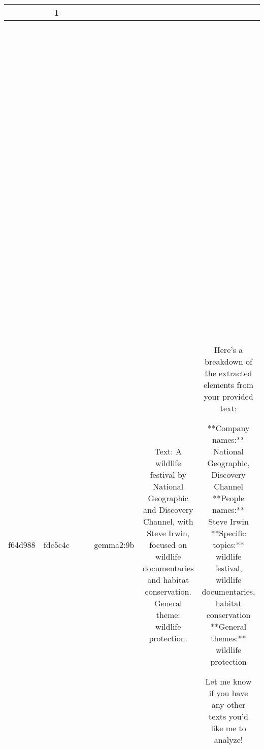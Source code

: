 \begin{table}[h!]
\begin{tabular}{|c|c|c|c|c|c|c|c|c|c|}
{4. **General themes**: The output provides "wildlife protection" as the general theme, adhering to the requested format.

Each section of the output adheres to the desired structure outlined in the description, using proper formatting, such as comma separation and indicating absence with "-||-". There are no discrepancies or deviations from the described format.

No violation.
OK & 1\\
\hline
f64d988 & fdc5c4c &  &  & gemma2:9b & Text: A wildlife festival by National Geographic and Discovery Channel, with Steve Irwin, focused on wildlife documentaries and habitat conservation. General theme: wildlife protection. & Here's a breakdown of the extracted elements from your provided text:

**Company names:** National Geographic, Discovery Channel 
**People names:** Steve Irwin
**Specific topics:** wildlife festival, wildlife documentaries, habitat conservation
**General themes:** wildlife protection 


Let me know if you have any other texts you'd like me to analyze!  
 & ok & The evaluation process involves checking whether the chatbot's output format complies with the described format for extracted elements:
- The format provided requires a comma-separated list for categories: Company names, People names, Specific topics, and General Themes.
- The output is indeed using a comma-separated format for each category.

1. **Company names:** The output lists "National Geographic, Discovery Channel" with a comma-separated format, which complies with the required format.
2. **People names:** The output lists "Steve Irwin" in a format consistent with the description.
3. **Specific topics:** The output provides "wildlife festival, wildlife documentaries, habitat conservation" as a comma-separated list, meeting the expected format.
4. **General themes:** "Wildlife protection" is listed correctly and follows the specified format.

Overall, the chatbot's response adheres to the format specified in the description with correct categories and comma-separated lists.

OK & 1\\
\hline
25e6bf7 & fdc5c4c &  &  & llama3.2:1b & Text: At a culinary leadership forum with Nestlé and Starbucks, discussions led by Howard Schultz on food industry norms and coffee trends. General theme: industrial gastronomy. & Here are the extracted elements of the text:

}
\end{tabular}
\end{table}
